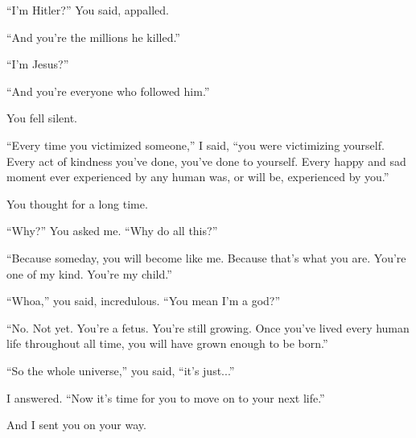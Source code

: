 “I'm Hitler?” You said, appalled.

“And you're the millions he killed.”


“I'm Jesus?”

“And you're everyone who followed him.”

You fell silent.

“Every time you victimized someone,” I said, “you were victimizing yourself. Every act of kindness you've done, you've done to yourself. Every happy and sad moment ever experienced by any human was, or will be, experienced by you.”

You thought for a long time.

“Why?” You asked me. “Why do all this?”

“Because someday, you will become like me. Because that's what you are. You're one of my kind. You're my child.”

“Whoa,” you said, incredulous. “You mean I'm a god?”

“No. Not yet. You're a fetus. You're still growing. Once you've lived every human life throughout all time, you will have grown enough to be born.”

“So the whole universe,” you said, “it's just...”

\vspace{2.5mm}{\huge “An egg.”} I answered. “Now it's time for you to move on to your next life.”

And I sent you on your way.


